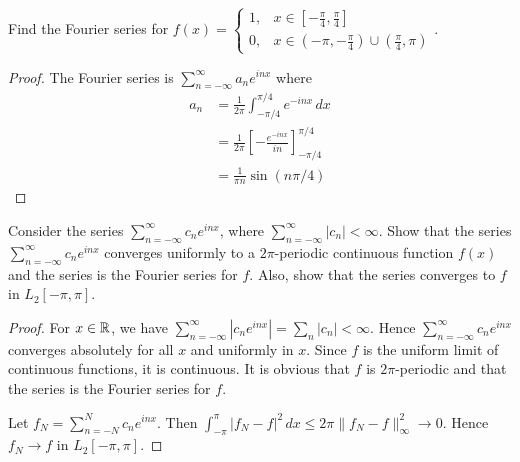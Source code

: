 \documentclass{article}
\begin{document}
 Find the Fourier series for $\displaystyle f(x)=\left\{ \begin{array}{ll}
1, & x \in [- \frac \pi 4 , \frac \pi 4]
\\ 0, & x \in (-\pi,- \frac \pi 4) \cup(\frac \pi 4, \pi) 
\end{array}\right. .$
\begin{proof}
The Fourier series is $\sum_{n = -\infty}^{\infty} a_n e^{inx}$ where
\begin{align*}
a_n & = \frac 1 {2 \pi} \int_{-\pi/4}^{\pi / 4} e^{-inx} \, dx
\\ & =  \frac 1 {2 \pi} \left[ - \frac {e^{-inx}}{in} \right]_{-\pi/4}^{\pi/4}
\\ & =   \frac 1 {\pi n} \sin(n \pi/4)
\end{align*}

\end{proof}

 Consider the series $\sum_{n=-\infty}^\infty c_n e^{inx}$, where $\sum_{n=-\infty}^\infty |c_n| < \infty$. Show that the series $\sum_{n= -\infty}^\infty c_n e^{inx}$ converges uniformly to a $2\pi$-periodic continuous function $f(x)$ and the series is the Fourier series for $f$. Also, show that the series converges to $f$ in $L_2[-\pi, \pi]$.

\begin{proof}
For $x \in \mathbb{R}$, we have $\sum_{n = -\infty}^\infty |c_n e^{inx}| = \sum_n |c_n| < \infty$. Hence $\sum_{n = -\infty}^\infty c_n e^{inx}$ converges absolutely for all $x$ and uniformly in $x$.  Since $f$ is the uniform limit of continuous functions, it is continuous. It is obvious that $f$ is  $2\pi$-periodic and that the series is the Fourier series for $f$. 

Let $f_N = \sum_{n = -N}^N c_n e^{inx}$.  Then $\int_{-\pi}^\pi |f_N - f|^2 \,dx \le 2 \pi \|f_N - f\|_\infty^2 \to 0$. Hence $f_N \to f$ in $L_2[-\pi, \pi]$.
\end{proof}
\end{document}
